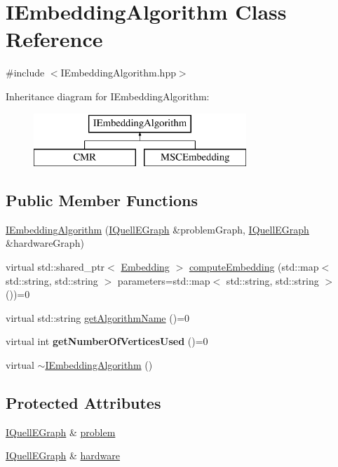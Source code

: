 \hypertarget{a00071}{}\section{I\+Embedding\+Algorithm Class Reference}
\label{a00071}


{\ttfamily \#include $<$I\+Embedding\+Algorithm.\+hpp$>$}

Inheritance diagram for I\+Embedding\+Algorithm\+:\begin{figure}[H]
\begin{center}
\leavevmode
\includegraphics[height=2.000000cm]{a00071}
\end{center}
\end{figure}
\subsection*{Public Member Functions}
\begin{DoxyCompactItemize}
\item 
\hyperlink{a00071_af5fcf01601ceff6a9782d8ef2918f7f5}{I\+Embedding\+Algorithm} (\hyperlink{a00076}{I\+Quell\+E\+Graph} \&problem\+Graph, \hyperlink{a00076}{I\+Quell\+E\+Graph} \&hardware\+Graph)
\item 
virtual std\+::shared\+\_\+ptr$<$ \hyperlink{a00050}{Embedding} $>$ \hyperlink{a00071_a0a56d5731381551efcb4c088bca6c817}{compute\+Embedding} (std\+::map$<$ std\+::string, std\+::string $>$ parameters=std\+::map$<$ std\+::string, std\+::string $>$())=0
\item 
virtual std\+::string \hyperlink{a00071_aac9fc812fb7e84b8a379ab5f60167f2c}{get\+Algorithm\+Name} ()=0
\item 
virtual int {\bfseries get\+Number\+Of\+Vertices\+Used} ()=0\hypertarget{a00071_a764c83e4d19b7608693177e2e720cd49}{}\label{a00071_a764c83e4d19b7608693177e2e720cd49}

\item 
virtual \hyperlink{a00071_a0a28540eb6e6cb7f302e785fd2e8f05b}{$\sim$\+I\+Embedding\+Algorithm} ()
\end{DoxyCompactItemize}
\subsection*{Protected Attributes}
\begin{DoxyCompactItemize}
\item 
\hyperlink{a00076}{I\+Quell\+E\+Graph} \& \hyperlink{a00071_a279b1546d6d308ccfa104a70fb6f8474}{problem}
\item 
\hyperlink{a00076}{I\+Quell\+E\+Graph} \& \hyperlink{a00071_aacf081e6ad5824b339b212844eb61b63}{hardware}
\end{DoxyCompactItemize}


